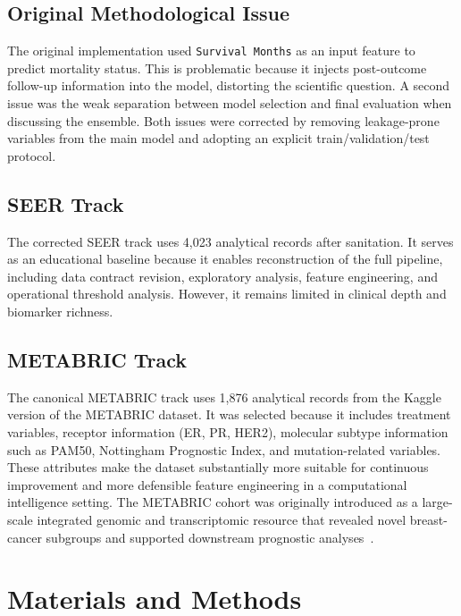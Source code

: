 \documentclass[conference]{IEEEtran}
\begin{document}
\subsection{Original Methodological Issue}

The original implementation used \texttt{Survival Months} as an input feature to predict mortality status. This is problematic because it injects post-outcome follow-up information into the model, distorting the scientific question. A second issue was the weak separation between model selection and final evaluation when discussing the ensemble. Both issues were corrected by removing leakage-prone variables from the main model and adopting an explicit train/validation/test protocol.

\subsection{SEER Track}

The corrected SEER track uses 4,023 analytical records after sanitation. It serves as an educational baseline because it enables reconstruction of the full pipeline, including data contract revision, exploratory analysis, feature engineering, and operational threshold analysis. However, it remains limited in clinical depth and biomarker richness.

\subsection{METABRIC Track}

The canonical METABRIC track uses 1,876 analytical records from the Kaggle version of the METABRIC dataset. It was selected because it includes treatment variables, receptor information (ER, PR, HER2), molecular subtype information such as PAM50, Nottingham Prognostic Index, and mutation-related variables. These attributes make the dataset substantially more suitable for continuous improvement and more defensible feature engineering in a computational intelligence setting. The METABRIC cohort was originally introduced as a large-scale integrated genomic and transcriptomic resource that revealed novel breast-cancer subgroups and supported downstream prognostic analyses~\cite{curtis2012,metabricportal}.

\section{Materials and Methods}
\end{document}
